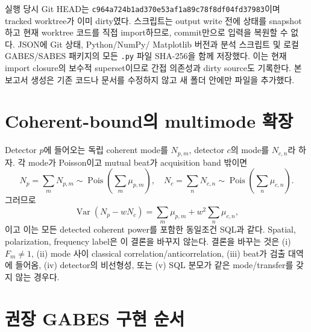 \documentclass[11pt,a4paper]{article}
\newcommand{\Var}{\operatorname{Var}}
\begin{document}
실행 당시 Git HEAD는
\texttt{c964a724b1ad370e53af1a89c78f8df04fd37983}이며 tracked worktree가 이미 dirty였다.
스크립트는 output write 전에 상태를 snapshot하고 현재 worktree 코드를 직접
import하므로, commit만으로 입력을 복원할 수 없다. JSON에 Git 상태, Python/NumPy/
Matplotlib 버전과 분석 스크립트 및 로컬 GABES/SABES 패키지의 모든
\texttt{.py} 파일 SHA-256을 함께 저장했다. 이는 현재 import closure의 보수적
superset이므로 간접 의존성과 dirty source도 기록한다. 본 보고서
생성은 기존 코드나 문서를 수정하지 않고 새 폴더 안에만 파일을 추가했다.

\section{Coherent-bound의 multimode 확장}

Detector $p$에 들어오는 독립 coherent mode를 $N_{p,m}$, detector $c$의 mode를
$N_{c,n}$라 하자. 각 mode가 Poisson이고 mutual beat가 acquisition band 밖이면
\begin{equation}
N_p=\sum_mN_{p,m}\sim\operatorname{Pois}\!\left(\sum_m\mu_{p,m}\right),
\quad
N_c=\sum_nN_{c,n}\sim\operatorname{Pois}\!\left(\sum_n\mu_{c,n}\right).
\end{equation}
그러므로
\begin{equation}
\Var(N_p-wN_c)=\sum_m\mu_{p,m}+w^2\sum_n\mu_{c,n},
\end{equation}
이고 이는 모든 detected coherent power를 포함한 동일조건 SQL과 같다. Spatial,
polarization, frequency label은 이 결론을 바꾸지 않는다. 결론을 바꾸는 것은
(i) $F_m\ne1$, (ii) mode 사이 classical correlation/anticorrelation,
(iii) beat가 검출 대역에 들어옴, (iv) detector의 비선형성, 또는
(v) SQL 분모가 같은 mode/transfer를 갖지 않는 경우다.

\section{권장 GABES 구현 순서}
\end{document}
